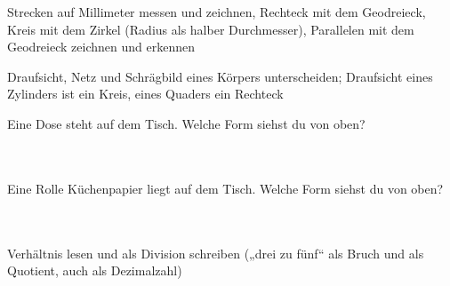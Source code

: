 \begin{aufgabe}{Strecken auf Millimeter messen und zeichnen, Rechteck mit dem Geodreieck, Kreis mit dem Zirkel (Radius als halber Durchmesser), Parallelen mit dem Geodreieck zeichnen und erkennen}
\end{aufgabe}

\begin{aufgabe}{Draufsicht, Netz und Schrägbild eines Körpers unterscheiden; Draufsicht eines Zylinders ist ein Kreis, eines Quaders ein Rechteck}
\begin{teile}
\teil Eine Dose steht auf dem Tisch. Welche Form siehst du von oben? \\  \\  \\ 
\end{teile}
\begin{teile}
\teil Eine Rolle Küchenpapier liegt auf dem Tisch. Welche Form siehst du von oben? \\  \\  \\ 
\end{teile}
\end{aufgabe}

\begin{aufgabe}{Verhältnis lesen und als Division schreiben („drei zu fünf“ als Bruch und als Quotient, auch als Dezimalzahl)}
\end{aufgabe}

